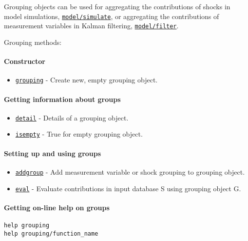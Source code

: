 

	Grouping objects can be used for aggregating the contributions of shocks
in model simulations, \href{model/simulate}{\texttt{model/simulate}}, or
aggregating the contributions of measurement variables in Kalman
filtering, \href{model/filter}{\texttt{model/filter}}.

Grouping methods:

\paragraph{Constructor}\label{constructor}

\begin{itemize}
\itemsep1pt\parskip0pt
\item
  \href{grouping/grouping}{\texttt{grouping}} - Create new, empty
  grouping object.
\end{itemize}

\paragraph{Getting information about
groups}\label{getting-information-about-groups}

\begin{itemize}
\itemsep1pt\parskip0pt
\item
  \href{grouping/detail}{\texttt{detail}} - Details of a grouping
  object.
\item
  \href{grouping/isempty}{\texttt{isempty}} - True for empty grouping
  object.
\end{itemize}

\paragraph{Setting up and using
groups}\label{setting-up-and-using-groups}

\begin{itemize}
\itemsep1pt\parskip0pt
\item
  \href{grouping/addgroup}{\texttt{addgroup}} - Add measurement variable
  or shock grouping to grouping object.
\item
  \href{grouping/eval}{\texttt{eval}} - Evaluate contributions in input
  database S using grouping object G.
\end{itemize}

\paragraph{Getting on-line help on
groups}\label{getting-on-line-help-on-groups}

\begin{verbatim}
help grouping
help grouping/function_name
\end{verbatim}



